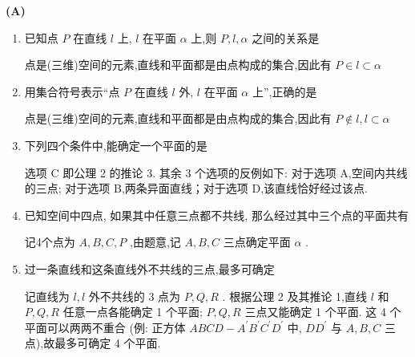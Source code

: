 \begin{center}  \textbf{(A)} \end{center}
\begin{enumerate}
    \item 已知点 $P$ 在直线 $l$ 上, $l$ 在平面 $\alpha$ 上,则 $P,l,\alpha$ 之间的关系是
    \begin{jieda}
        点是(三维)空间的元素,直线和平面都是由点构成的集合,因此有 $P \in  l \subset  \alpha$
    \end{jieda}
    \item 用集合符号表示“点 $P$ 在直线 $l$ 外, $l$ 在平面 $\alpha$ 上”,正确的是 
    \begin{jieda}
        点是(三维)空间的元素,直线和平面都是由点构成的集合,因此有 $P \notin  l,l \subset  \alpha$
    \end{jieda}
    \item 下列四个条件中,能确定一个平面的是
    \begin{jieda}
        选项 C 即公理 2 的推论 3. 其余 3 个选项的反例如下: 对于选项 A,空间内共线的三点; 对于选项 B,两条异面直线；对于选项 D,该直线恰好经过该点.
    \end{jieda}
    \item 已知空间中四点, 如果其中任意三点都不共线, 那么经过其中三个点的平面共有 
    \begin{jieda}
        记4个点为 $A,B,C,P$ ,由题意,记 $A,B,C$ 三点确定平面 $\alpha$ .
    \end{jieda}
    \item 过一条直线和这条直线外不共线的三点,最多可确定
    \begin{jieda}
        记直线为 $l,l$ 外不共线的 3 点为 $P,Q,R$ . 根据公理 2 及其推论 1,直线 $l$ 和 $P,Q,R$ 任意一点各能确定 1 个平面; $P,Q,R$ 三点又能确定 1 个平面. 这 4 个平面可以两两不重合 (例: 正方体 ${ABCD} - {A}^{\prime }{B}^{\prime }{C}^{\prime }{D}^{\prime }$ 中, $D{D}^{\prime }$ 与 $A,B,C$ 三点),故最多可确定 4 个平面. 
        

\end{jieda}
\end{enumerate}
